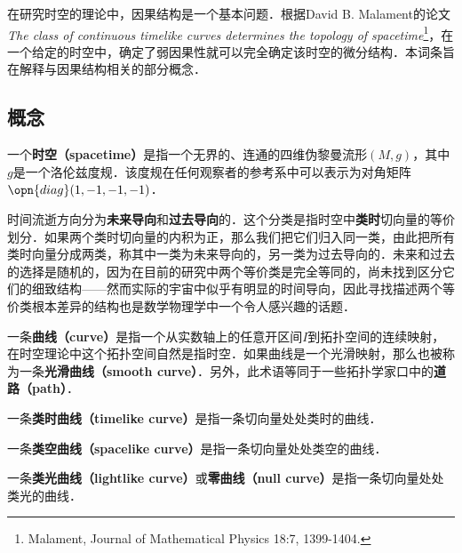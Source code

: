 



在研究时空的理论中，因果结构是一个基本问题．根据David B. Malament的论文\textsl{The class of continuous timelike curves determines the topology of spacetime}\footnote{Malament, Journal of Mathematical Physics 18:7, 1399-1404. }，在一个给定的时空中，确定了弱因果性就可以完全确定该时空的微分结构．本词条旨在解释与因果结构相关的部分概念．

\subsection{概念}

一个\textbf{时空（spacetime）}是指一个无界的、连通的四维伪黎曼流形$(M, g)$，其中$g$是一个洛伦兹度规．该度规在任何观察者的参考系中可以表示为对角矩阵$\opn{diag}(1, -1, -1, -1)$．

时间流逝方向分为\textbf{未来导向}和\textbf{过去导向}的．这个分类是指时空中\textbf{类时}切向量的等价划分．如果两个类时切向量的内积为正，那么我们把它们归入同一类，由此把所有类时向量分成两类，称其中一类为未来导向的，另一类为过去导向的．未来和过去的选择是随机的，因为在目前的研究中两个等价类是完全等同的，尚未找到区分它们的细致结构——然而实际的宇宙中似乎有明显的时间导向，因此寻找描述两个等价类根本差异的结构也是数学物理学中一个令人感兴趣的话题．

一条\textbf{曲线（curve）}是指一个从实数轴上的任意开区间$I$到拓扑空间的连续映射，在时空理论中这个拓扑空间自然是指时空．如果曲线是一个光滑映射，那么也被称为一条\textbf{光滑曲线（smooth curve）}．另外，此术语等同于一些拓扑学家口中的\textbf{道路（path）}．

一条\textbf{类时曲线（timelike curve）}是指一条切向量处处类时的曲线．

一条\textbf{类空曲线（spacelike curve）}是指一条切向量处处类空的曲线．

一条\textbf{类光曲线（lightlike curve）}或\textbf{零曲线（null curve）}是指一条切向量处处类光的曲线．




